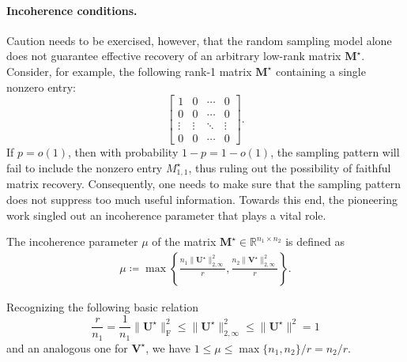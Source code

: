 \paragraph{Incoherence conditions.}
Caution needs to be exercised, however,  that the random sampling model alone does not guarantee effective recovery of an arbitrary low-rank matrix $\bm{M}^{\star}$.
Consider, for example, the following rank-1 matrix $\bm{M}^{\star}$ containing a single nonzero entry:
%
\[
\left[\begin{array}{cccc}
1 & 0 & \cdots & 0\\
0 & 0 & \cdots & 0\\
\vdots & \vdots & \ddots & \vdots\\
0 & 0 & \cdots & 0
\end{array}\right] .
\]
%
If $p=o(1)$, then with probability $1-p=1-o(1)$, the sampling pattern will fail to include the nonzero entry $M_{1,1}^{\star}$,
thus ruling out the possibility of faithful matrix recovery.
Consequently,  one needs to make sure that the sampling pattern does not suppress too much useful information.
Towards this end, the pioneering work \citet{candes2009exact, candes2010NearOptimalMC} singled out an incoherence parameter that plays a vital role.
%
\begin{definition}
\label{assump:mc-incoherence}
The incoherence parameter $\mu$ of the matrix $\bm{M}^{\star}\in\mathbb{R}^{n_{1}\times n_{2}}$ is defined as
%
\begin{align*}
	\mu\coloneqq \max\left\{  \frac{ n_1 \|\bm{U}^{\star}\|_{2,\infty}^2 }{r} ,  \frac{ n_2 \|\bm{V}^{\star}\|_{2,\infty}^2 }{r} \right\} .
\end{align*}
%
\end{definition}
%
\begin{remark}
\label{remark:range-mu-MC}
%
Recognizing the following basic relation
%
\[
	\frac{r}{n_1}=\frac{1}{n_1} \|\bm{U}^{\star}\|_{\mathrm{F}}^2 \leq \|\bm{U}^{\star}\|_{2,\infty}^2 \leq \|\bm{U}^{\star}\|^2 = 1
\]
%
and an analogous one for $\bm{V}^{\star}$, we have $1\leq \mu \leq \max\{n_1,n_2\}/r= n_2/r$.
%
\end{remark}


